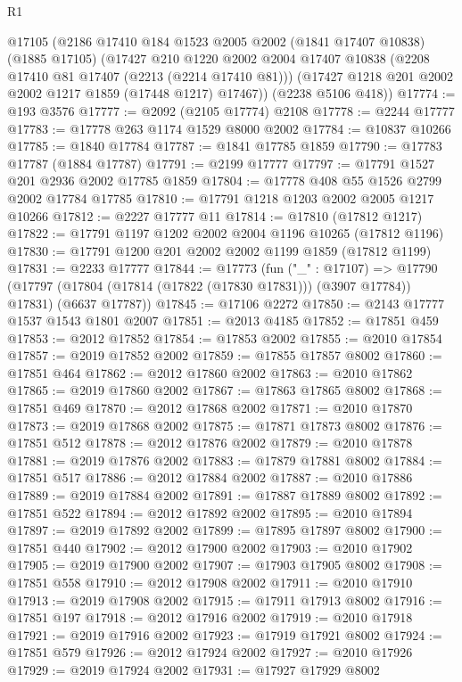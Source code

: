 \begin{lexlean}{R1}
\begin{coremodule}
    @17105
    (@2186
      @17410
      @184
      @1523
      @2005
      @2002
      (@1841 @17407 @10838)
      (@1885 @17105)
      (@17427
        @210
        @1220
        @2002
        @2004
        @17407
        @10838
        (@2208 @17410 @81 @17407 (@2213 (@2214 @17410 @81)))
        (@17427 @1218 @201 @2002 @2002 @1217 @1859 (@17448 @1217) @17467))
      (@2238 @5106 @418))
@17774 := @193 @3576
@17777 := @2092 (@2105 @17774) @2108
@17778 := @2244 @17777
@17783 := @17778 @263 @1174 @1529 @8000 @2002
@17784 := @10837 @10266
@17785 := @1840 @17784
@17787 := @1841 @17785 @1859
@17790 := @17783 @17787 (@1884 @17787)
@17791 := @2199 @17777
@17797 := @17791 @1527 @201 @2936 @2002 @17785 @1859
@17804 := @17778 @408 @55 @1526 @2799 @2002 @17784 @17785
@17810 := @17791 @1218 @1203 @2002 @2005 @1217 @10266
@17812 := @2227 @17777 @11
@17814 := @17810 (@17812 @1217)
@17822 := @17791 @1197 @1202 @2002 @2004 @1196 @10265 (@17812 @1196)
@17830 := @17791 @1200 @201 @2002 @2002 @1199 @1859 (@17812 @1199)
@17831 := @2233 @17777
@17844 := @17773
    (fun ("_" : @17107) =>
    @17790 (@17797 (@17804 (@17814 (@17822 (@17830 @17831))) (@3907 @17784)) @17831) (@6637 @17787))
@17845 := @17106 @2272
@17850 := @2143 @17777 @1537 @1543 @1801 @2007
@17851 := @2013 @4185
@17852 := @17851 @459
@17853 := @2012 @17852
@17854 := @17853 @2002
@17855 := @2010 @17854
@17857 := @2019 @17852 @2002
@17859 := @17855 @17857 @8002
@17860 := @17851 @464
@17862 := @2012 @17860 @2002
@17863 := @2010 @17862
@17865 := @2019 @17860 @2002
@17867 := @17863 @17865 @8002
@17868 := @17851 @469
@17870 := @2012 @17868 @2002
@17871 := @2010 @17870
@17873 := @2019 @17868 @2002
@17875 := @17871 @17873 @8002
@17876 := @17851 @512
@17878 := @2012 @17876 @2002
@17879 := @2010 @17878
@17881 := @2019 @17876 @2002
@17883 := @17879 @17881 @8002
@17884 := @17851 @517
@17886 := @2012 @17884 @2002
@17887 := @2010 @17886
@17889 := @2019 @17884 @2002
@17891 := @17887 @17889 @8002
@17892 := @17851 @522
@17894 := @2012 @17892 @2002
@17895 := @2010 @17894
@17897 := @2019 @17892 @2002
@17899 := @17895 @17897 @8002
@17900 := @17851 @440
@17902 := @2012 @17900 @2002
@17903 := @2010 @17902
@17905 := @2019 @17900 @2002
@17907 := @17903 @17905 @8002
@17908 := @17851 @558
@17910 := @2012 @17908 @2002
@17911 := @2010 @17910
@17913 := @2019 @17908 @2002
@17915 := @17911 @17913 @8002
@17916 := @17851 @197
@17918 := @2012 @17916 @2002
@17919 := @2010 @17918
@17921 := @2019 @17916 @2002
@17923 := @17919 @17921 @8002
@17924 := @17851 @579
@17926 := @2012 @17924 @2002
@17927 := @2010 @17926
@17929 := @2019 @17924 @2002
@17931 := @17927 @17929 @8002

\end{coremodule}
\end{lexlean}
